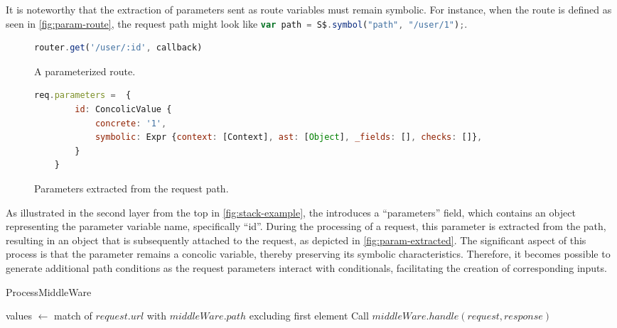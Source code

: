 It is noteworthy that the extraction of parameters sent as route variables must remain symbolic. For instance, when the route is defined as seen in \autoref{fig:param-route}, the request path might look like \lstinline[language=JavaScript, gobble=4]{var path = S$.symbol("path", "/user/1");}.


\begin{figure}[H]
    \begin{lstlisting}[language=JavaScript, gobble=4]
    router.get('/user/:id', callback) 
    \end{lstlisting}
    \caption{A parameterized route.}
    \label{fig:param-route}
\end{figure}

\begin{figure}[ht]
    \begin{lstlisting}[language=JavaScript, gobble=4]
    req.parameters =  {
        id: ConcolicValue {
            concrete: '1',
            symbolic: Expr {context: [Context], ast: [Object], _fields: [], checks: []},
        }
    }
    \end{lstlisting}
    \caption{Parameters extracted from the request path.}
    \label{fig:param-extracted}
\end{figure}
As illustrated in the second layer from the top in \autoref{fig:stack-example}, the  introduces a “parameters” field, which contains an object representing the parameter variable name, specifically “id”. During the processing of a request, this parameter is extracted from the path, resulting in an object that is subsequently attached to the request, as depicted in \autoref{fig:param-extracted}.
The significant aspect of this process is that the parameter remains a concolic variable, thereby preserving its symbolic characteristics. Therefore, it becomes possible to generate additional path conditions as the request parameters interact with conditionals, facilitating the creation of corresponding inputs.

\begin{algorithm}[ht]
\caption{ProcessMiddleWare}
values $\gets$ match of $request.url$ with $middleWare.path$ excluding first element\;
Call $middleWare.handle(request, response)$\;
\end{algorithm}




